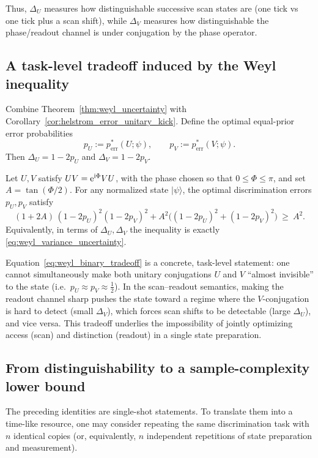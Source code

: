 Thus, $\Delta_U$ measures how distinguishable successive scan states are (one tick vs one tick plus a scan shift), while $\Delta_V$ measures how distinguishable the phase/readout channel is under conjugation by the phase operator.

\subsection{A task-level tradeoff induced by the Weyl inequality}
\label{app:weyl_task_tradeoff}
Combine Theorem~\ref{thm:weyl_uncertainty} with Corollary~\ref{cor:helstrom_error_unitary_kick}.
Define the optimal equal-prior error probabilities
\begin{equation}
p_U:=p_{\mathrm{err}}^{*}(U;\psi),\qquad p_V:=p_{\mathrm{err}}^{*}(V;\psi).
\end{equation}
Then $\Delta_U=1-2p_U$ and $\Delta_V=1-2p_V$.

\begin{proposition}
\label{prop:weyl_binary_tradeoff}
Let $U,V$ satisfy $UV=\mathrm{e}^{\mathrm{i}\Phi}VU$, with the phase chosen so that $0\le\Phi\le\pi$, and set $A=\tan(\Phi/2)$.
For any normalized state $|\psi\rangle$, the optimal discrimination errors $p_U,p_V$ satisfy
\begin{equation}
(1+2A)\,(1-2p_U)^2(1-2p_V)^2 + A^2\bigl((1-2p_U)^2+(1-2p_V)^2\bigr)\ \ge\ A^2.
\label{eq:weyl_binary_tradeoff}
\end{equation}
Equivalently, in terms of $\Delta_U,\Delta_V$ the inequality is exactly \eqref{eq:weyl_variance_uncertainty}.
\end{proposition}

\begin{remark}
\label{rem:weyl_tradeoff_resource_reading}
Equation~\eqref{eq:weyl_binary_tradeoff} is a concrete, task-level statement: one cannot simultaneously make both unitary conjugations $U$ and $V$ ``almost invisible'' to the state (i.e.\ $p_U\approx p_V\approx \tfrac12$).
In the scan--readout semantics, making the readout channel sharp pushes the state toward a regime where the $V$-conjugation is hard to detect (small $\Delta_V$), which forces scan shifts to be detectable (large $\Delta_U$), and vice versa.
This tradeoff underlies the impossibility of jointly optimizing access (scan) and distinction (readout) in a single state preparation.
\end{remark}

\subsection{From distinguishability to a sample-complexity lower bound}
\label{app:weyl_sample_complexity}
The preceding identities are single-shot statements.
To translate them into a time-like resource, one may consider repeating the same discrimination task with $n$ identical copies (or, equivalently, $n$ independent repetitions of state preparation and measurement).

